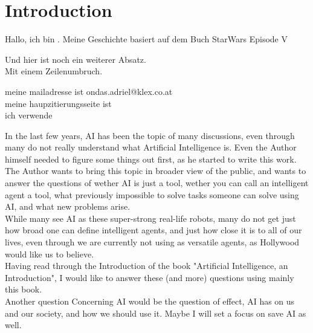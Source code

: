 \chapter{Introduction}

Hallo, ich bin \@author. Meine Geschichte basiert auf dem Buch StarWars Episode V %

Und hier ist noch ein weiterer Absatz. \\
Mit einem Zeilenumbruch.

meine mailadresse ist ondas.adriel@klex.co.at\cite{KLEXKlusemannExtern}\\
meine haupzitierungsseite ist \cite{WikipediaFreieEnzyklopadie}\\
ich verwende \cite{ZoteroDownloads}

In the last few years, AI has been the topic of many discussions, even through many do not really understand what Artificial Intelligence is. 
Even the Author himself needed to figure some things out first, as he started to write this work. \\
The Author wants to bring this topic in broader view of the public, and wants to answer the questions of wether AI is just a tool, wether you can call an intelligent agent a tool, what previously impossible to solve tasks someone can solve using AI, and what new problems arise.\\
While many see AI as these super-strong real-life robots, many do not get just how broad one can define intelligent agents, and just how close it is to all of our lives, even through we are currently not using as versatile agents, as Hollywood would like us to believe.\\
Having read through the Introduction of the book "Artificial Intelligence, an Introduction", I would like to answer these (and more) questions using mainly this book.\\
Another question Concerning AI would be the question of effect, AI has on us and our society, and how we should use it. Maybe I will set a focus on save AI as well.\\
